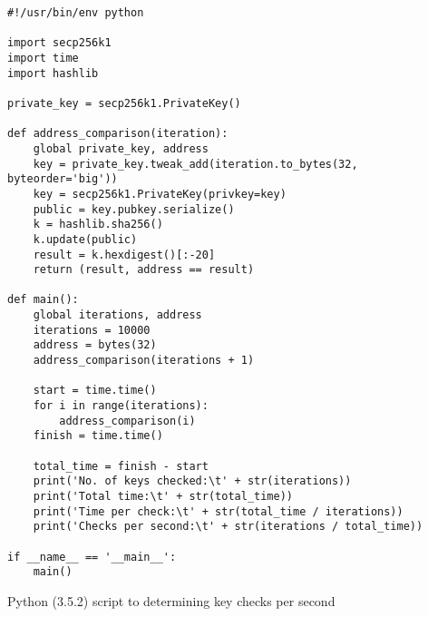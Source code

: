 \begin{listing}[H]
  \centering
  \begin{verbatim}
#!/usr/bin/env python

import secp256k1
import time
import hashlib

private_key = secp256k1.PrivateKey()

def address_comparison(iteration):
    global private_key, address
    key = private_key.tweak_add(iteration.to_bytes(32, byteorder='big'))
    key = secp256k1.PrivateKey(privkey=key)
    public = key.pubkey.serialize()
    k = hashlib.sha256()
    k.update(public)
    result = k.hexdigest()[:-20]
    return (result, address == result)

def main():
    global iterations, address
    iterations = 10000
    address = bytes(32)
    address_comparison(iterations + 1)

    start = time.time()
    for i in range(iterations):
        address_comparison(i)
    finish = time.time()

    total_time = finish - start
    print('No. of keys checked:\t' + str(iterations))
    print('Total time:\t' + str(total_time))
    print('Time per check:\t' + str(total_time / iterations))
    print('Checks per second:\t' + str(iterations / total_time))

if __name__ == '__main__':
    main()
  \end{verbatim}
  \caption{Python (3.5.2) script to determining key checks per second}
  \label{code:secp256k1_benchmark}
\end{listing}
